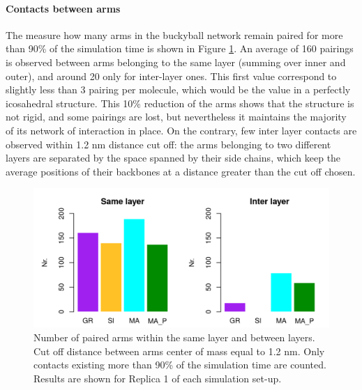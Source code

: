 \paragraph{Contacts between arms} The measure how many arms in the buckyball network remain paired for more than 90\% of the simulation time is shown in Figure \ref{fig:BTI_beta}. An average of 160 pairings is observed between arms belonging to the same layer (summing over inner and outer), and around 20 only for inter-layer ones.
%
This first value correspond to slightly less than 3 pairing per molecule, which would be the value in a perfectly icosahedral structure. This 10\% reduction of the arms shows that the structure is not rigid, and some pairings are lost, but nevertheless it maintains the majority of its network of interaction in place.
%
On the contrary, few inter layer contacts are observed within 1.2 nm distance cut off: the arms belonging to two different layers are separated by the space spanned by their side chains, which keep the average positions of their backbones at a distance greater than the cut off chosen.
%
\begin{figure}[t!]
\centering
\includegraphics[width=0.85\linewidth]{3results_capsule/pics/stAll_beta_90_R1.png}
\caption[Arm pairing during simulations of the buckyball]{Number of paired arms within the same layer and between layers. Cut off distance between arms center of mass equal to 1.2 nm. Only contacts existing more than 90\% of the simulation time are counted. Results are shown for Replica 1 of each simulation set-up.}
\label{fig:BTI_beta}
\end{figure}


